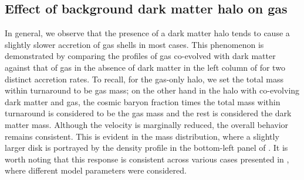 \subsection{Effect of background dark matter halo on gas}
In general, we observe that the presence of a dark matter halo tends to cause a slightly slower accretion of gas shells in most cases. This phenomenon is demonstrated by comparing the profiles of gas co-evolved with dark matter against that of gas in the absence of dark matter in the left column of  for two distinct accretion rates. To recall, for the gas-only halo, we set the total mass within turnaround to be gas mass; on the other hand in the halo with co-evolving dark matter and gas, the cosmic baryon fraction times the total mass within turnaround is considered to be the gas mass and the rest is considered the dark matter mass. Although the velocity is marginally reduced, the overall behavior remains consistent. This is evident in the mass distribution, where a slightly larger disk is portrayed by the density profile in the bottom-left panel of . It is worth noting that this response is consistent across various cases presented in , where different model parameters were considered.

